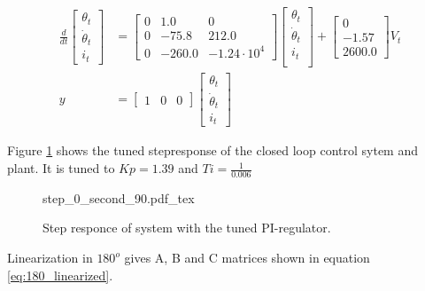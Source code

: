 \documentclass[../../../Main]{subfiles}
\begin{document}
\begin{equation}
      \label{eq:90_linearized}
      \begin{split}
      \frac{d}{dt}
    \begin{bmatrix}
        \theta_t \\
        \dot \theta_t \\
        i_t
    \end{bmatrix}
    &=
    \begin{bmatrix}0 & 1.0 & 0\\ 0  & -75.8 & 212.0\\ 0 & -260.0 & -1.24 \cdot 10^4 \end{bmatrix}
    \begin{bmatrix}
        \theta_t \\
        \dot \theta_t \\
        i_t \\
    \end{bmatrix}
    +
    \begin{bmatrix}
     0\\ -1.57\\ 2600.0
    \end{bmatrix}
    V_t \\
		y &=
    \begin{bmatrix}
        1 & 0 & 0
    \end{bmatrix}
    \begin{bmatrix}
        \theta_t \\
        \dot \theta_t\\
        i_t
    \end{bmatrix}
    \end{split}
\end{equation}

Figure \ref{fig:step_0_second_90} shows the tuned stepresponse of the closed loop control sytem and plant.
It is tuned to $Kp = 1.39$ and $Ti = \frac{1}{0.006}$
\begin{figure}[H]
\centering
\def\svgwidth{\textwidth}
{step_0_second_90.pdf_tex}
\caption{Step responce of system with the tuned PI-regulator.}
\label{fig:step_0_second_90}
\end{figure}


Linearization in $180^o$ gives A, B and C matrices shown in equation \ref{eq:180_linearized}. 
\end{document}
